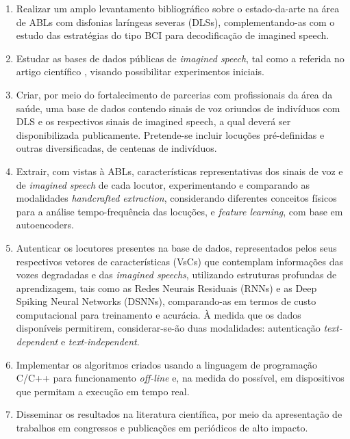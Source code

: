 \documentclass[a4paper,12pt,openright,oneside]{book}
\begin{document}
		\begin{enumerate}
			\item Realizar um amplo levantamento bibliográfico sobre o estado-da-arte na área de ABLs com disfonias laríngeas severas (DLSs), complementando-as com o estudo das estratégias do tipo BCI para decodificação de imagined speech.
			\item Estudar as bases de dados públicas de \textit{imagined speech}, tal como a referida no artigo científico \cite{10.1117/12.2255697}, visando possibilitar experimentos iniciais.
			\item Criar, por meio do fortalecimento de parcerias com profissionais da área da saúde, uma base de dados contendo sinais de voz oriundos de indivíduos com DLS e os respectivos sinais de imagined speech, a qual deverá ser disponibilizada publicamente. Pretende-se incluir locuções pré-definidas e outras diversificadas, de centenas de indivíduos.
			\item Extrair, com vistas à ABLs, características representativas dos sinais de voz e de \textit{imagined speech} de cada locutor, experimentando e comparando as modalidades \textit{handcrafted extraction}, considerando diferentes conceitos físicos para a análise tempo-frequência das locuções, e \textit{feature learning}, com base em autoencoders.
			\item Autenticar os locutores presentes na base de dados, representados pelos seus respectivos vetores de características (VsCs) que contemplam informações das vozes degradadas e das \textit{imagined speechs}, utilizando estruturas profundas de aprendizagem, tais como as Redes Neurais Residuais (RNNs) e as Deep Spiking Neural Networks (DSNNs), comparando-as em termos de custo computacional para treinamento e acurácia. À medida que os dados disponíveis permitirem, considerar-se-ão duas modalidades: autenticação \textit{text-dependent} e \textit{text-independent}.
			\item Implementar os algoritmos criados usando a linguagem de programação C/C++ para funcionamento \textit{off-line} e, na medida do possível, em dispositivos que permitam a execução em tempo real.
			\item Disseminar os resultados na literatura científica, por meio da apresentação de trabalhos em congressos e publicações em periódicos de alto impacto.
		\end{enumerate}
	
\end{document}
